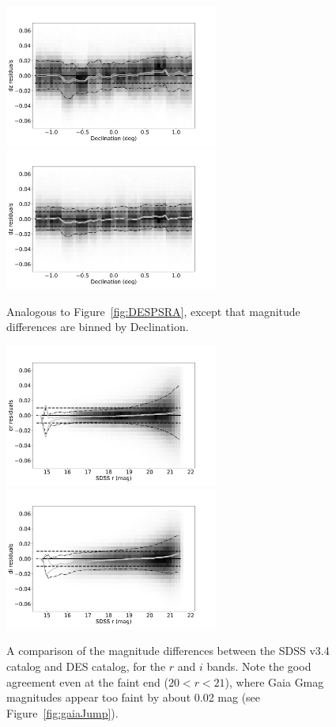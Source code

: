\begin{figure}
    \centering\includegraphics[width=7cm]{figures/colorResidDES2bright_dz_Dec_Hess.png}
    \centering\includegraphics[width=7cm]{figures/colorResidPSbright_dz_Dec_Hess.png}
\caption{Analogous to Figure~\ref{fig:DESPSRA}, except that magnitude differences
are binned by Declination.}
\label{fig:DESPSDec}
\end{figure}

\begin{figure}
    \centering\includegraphics[width=7cm]{figures/colorResidDES2_dr_rmag_Hess.png}
    \centering\includegraphics[width=7cm]{figures/colorResidDES2_di_rmag_Hess.png} 
\caption{A comparison of the magnitude differences between the SDSS v3.4 catalog
and DES catalog, for the $r$ and $i$ bands. Note the good agreement even at the
faint end ($20<r<21$), where Gaia Gmag magnitudes appear too faint by about
0.02 mag (see Figure~\ref{fig:gaiaJump}).} 
\label{fig:drVSr}
\end{figure}




